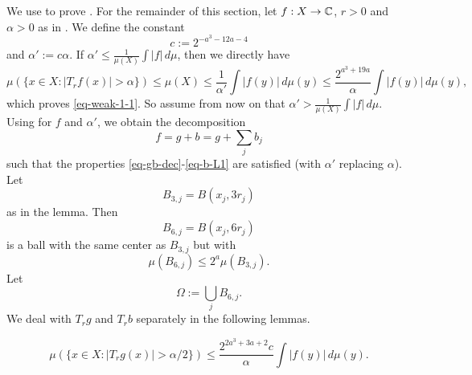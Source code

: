 We use  to prove . For the remainder of this section, let $f:X\to\mathbb{C}$, $r>0$ and $\alpha>0$ as in .
We define the constant
\begin{equation} \label{weak-1-1-proof-cz-const}
    c:= 2^{-a^3-12a-4}
\end{equation}
and $\alpha' := c\alpha$. If $\alpha'\le\frac{1}{\mu(X)}\int |f|\,d\mu$, then we directly have
\begin{equation*}
    \mu\left(\{x\in X: |T_r f(x)|>\alpha\}\right)\le \mu(X) \le \frac{1}{\alpha'} \int |f(y)|\, d\mu(y)
    \le \frac{2^{a^3 + 19a}}{\alpha} \int |f(y)|\, d\mu(y),
\end{equation*}
which proves \eqref{eq-weak-1-1}.
So assume from now on that $\alpha'>\frac{1}{\mu(X)}\int |f|\,d\mu$.
Using  for $f$ and $\alpha'$, we obtain the decomposition
\begin{equation*}
    f=g+b=g+\sum_j b_j
\end{equation*}
such that the properties \eqref{eq-gb-dec}-\eqref{eq-b-L1} are satisfied (with $\alpha'$ replacing $\alpha$). Let
\begin{equation}
    \label{eq-Ij-cj}
    B_{3,j}=B(x_j, 3r_j)
\end{equation}
as in the lemma. Then
\begin{equation}
    \label{eq-Ij*}
    B_{6,j}=B(x_j, 6r_j)
\end{equation}
is a ball with the same center as $B_{3,j}$ but with
\begin{equation}
    \label{eq-Ij*-dim}
    \mu(B_{6,j})\le 2^{a} \mu(B_{3,j}).
\end{equation}
Let
\begin{equation}
    \label{eq-omega}
    \Omega:=\bigcup_j B_{6,j}.
\end{equation}
We deal with $T_rg$ and $T_rb$ separately in the following lemmas.

\begin{lemma}
    \label{estimate-good}
    \leanok
    \begin{equation*}
        \mu\left(\{x\in X: |T_r g(x)|>{\alpha}/2\}\right)
        \le \frac{2^{2a^3+3a+2}c}{\alpha} \int |f(y)|\, d\mu(y).
    \end{equation*}

\end{lemma}

